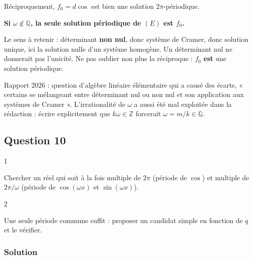 \documentclass[11pt,a4paper]{article}
\begin{document}
Réciproquement, \(f_0=d\cos\) est bien une solution \(2\pi\)-périodique.

\textbf{Si \(\omega\notin\mathbb Q\), la seule solution périodique de \((E)\) est \(f_0\).}

\begin{piege}

Le sens à retenir : déterminant \textbf{non nul}, donc système de Cramer, donc solution unique, ici la solution nulle d'un système homogène. Un déterminant nul ne donnerait pas l'unicité. Ne pas oublier non plus la réciproque : \(f_0\) \textbf{est} une solution périodique.

\end{piege}

\begin{jury}

Rapport 2026 : question d'algèbre linéaire élémentaire qui a causé des écarts, « certains se mélangeant entre déterminant nul ou non nul et son application aux systèmes de Cramer ». L'irrationalité de \(\omega\) a aussi été mal exploitée dans la rédaction : écrire explicitement que \(k\omega\in\mathbb Z\) forcerait \(\omega=m/k\in\mathbb Q\).

\end{jury}

\hypertarget{question-10}{%
\subsection{Question 10}\label{question-10}}

\begin{indication}{1}

Chercher un réel qui soit à la fois multiple de \(2\pi\) (période de \(\cos\)) et multiple de \(2\pi/\omega\) (période de \(\cos(\omega x)\) et \(\sin(\omega x)\)).

\end{indication}

\begin{indication}{2}

Une seule période commune suffit : proposer un candidat simple en fonction de \(q\) et le vérifier.

\end{indication}

\hypertarget{solution-9}{%
\subsubsection{Solution}\label{solution-9}}
\end{document}
